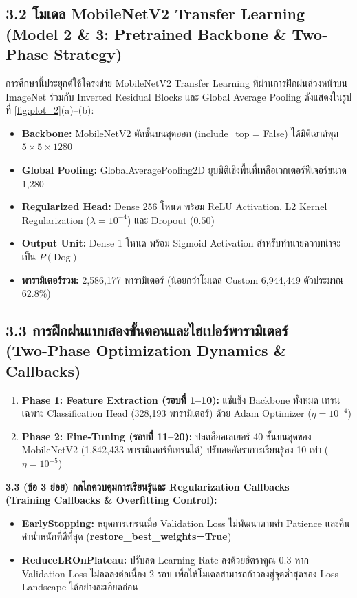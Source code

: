 \documentclass[12pt,a4paper]{article}
\newcommand{\codevar}[1]{\textcolor{codeaccent}{\textbf{#1}}}
\begin{document}
\subsection*{3.2 โมเดล MobileNetV2 Transfer Learning\\ \normalsize(Model 2 \& 3: Pretrained Backbone \& Two-Phase Strategy)}
การศึกษานี้ประยุกต์ใช้โครงข่าย MobileNetV2 Transfer Learning ที่ผ่านการฝึกฝนล่วงหน้าบน ImageNet ร่วมกับ Inverted Residual Blocks และ Global Average Pooling ดังแสดงในรูปที่ \ref{fig:plot_2}(a)--(b):
\begin{itemize}[leftmargin=1.8em, itemsep=1pt]
    \item \textbf{Backbone:} MobileNetV2 ตัดชั้นบนสุดออก (include\_top = False) ได้มิติเอาต์พุต $5 \times 5 \times 1280$
    \item \textbf{Global Pooling:} GlobalAveragePooling2D ยุบมิติเชิงพื้นที่เหลือเวกเตอร์ฟีเจอร์ขนาด 1,280
    \item \textbf{Regularized Head:} Dense 256 โหนด พร้อม ReLU Activation, L2 Kernel Regularization ($\lambda = 10^{-4}$) และ Dropout ($0.50$)
    \item \textbf{Output Unit:} Dense 1 โหนด พร้อม Sigmoid Activation สำหรับทำนายความน่าจะเป็น $P(\text{Dog})$
    \item \textbf{พารามิเตอร์รวม:} 2,586,177 พารามิเตอร์ (น้อยกว่าโมเดล Custom 6,944,449 ตัวประมาณ 62.8\%)
\end{itemize}

\subsection*{3.3 การฝึกฝนแบบสองขั้นตอนและไฮเปอร์พารามิเตอร์\\ \normalsize(Two-Phase Optimization Dynamics \& Callbacks)}
\begin{enumerate}[leftmargin=1.8em, itemsep=1pt]
    \item \textbf{Phase 1: Feature Extraction (รอบที่ 1--10):} แช่แข็ง Backbone ทั้งหมด เทรนเฉพาะ Classification Head (328,193 พารามิเตอร์) ด้วย Adam Optimizer ($\eta = 10^{-4}$)
    \item \textbf{Phase 2: Fine-Tuning (รอบที่ 11--20):} ปลดล็อคเลเยอร์ 40 ชั้นบนสุดของ MobileNetV2 (1,842,433 พารามิเตอร์ที่เทรนได้) ปรับลดอัตราการเรียนรู้ลง 10 เท่า ($\eta = 10^{-5}$)
\end{enumerate}

\clearpage
\noindent\textbf{3.3 (ข้อ 3 ย่อย) กลไกควบคุมการเรียนรู้และ Regularization Callbacks\\ \normalsize(Training Callbacks \& Overfitting Control):}
\vspace{0.4em}
\begin{itemize}[leftmargin=1.8em, itemsep=3pt]
    \item \textbf{EarlyStopping:} หยุดการเทรนเมื่อ Validation Loss ไม่พัฒนาตามค่า Patience และคืนค่าน้ำหนักที่ดีที่สุด (\codevar{restore\_best\_weights=True})
    \item \textbf{ReduceLROnPlateau:} ปรับลด Learning Rate ลงด้วยอัตราคูณ $0.3$ หาก Validation Loss ไม่ลดลงต่อเนื่อง 2 รอบ เพื่อให้โมเดลสามารถก้าวลงสู่จุดต่ำสุดของ Loss Landscape ได้อย่างละเอียดอ่อน
\end{itemize}
\end{document}
